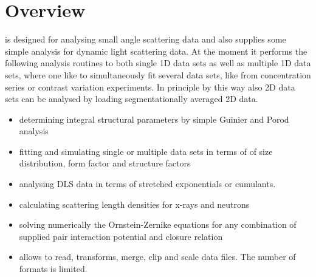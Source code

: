\section{Overview}

\SASfit is designed for analysing small angle scattering data and also supplies some simple analysis for dynamic light scattering data. At the moment it performs the following analysis routines to both single 1D data sets as well as multiple 1D data sets, where one like to simultaneously fit several data sets, like from concentration series or contrast variation experiments. In principle by this way also 2D data sets can be analysed by loading segmentationally averaged 2D data. 
\begin{itemize}
\item determining integral structural parameters by simple Guinier and Porod analysis
\item fitting and simulating single or multiple data sets in terms of of size distribution, form factor and structure factors
\item analysing DLS data in terms of stretched exponentials or cumulants.
\item calculating scattering length densities for x-rays and neutrons
\item solving numerically the Ornstein-Zernike equations for any combination of supplied pair interaction potential and closure relation
\item allows to read, transforms, merge, clip and scale data files. The number of formats is limited.
\end{itemize}

